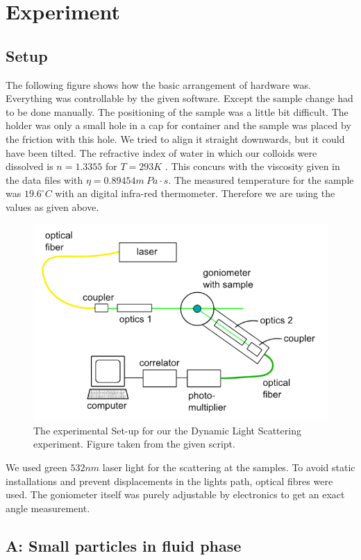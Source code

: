 \documentclass[]{article}
\begin{document}
\newpage
\section{Experiment}
\subsection{Setup}
The following figure shows how the basic arrangement of hardware was. Everything was controllable by the given software. Except the sample change had to be done manually. The positioning of the sample was a little bit difficult. The holder was only a small hole in a cap for container and the sample was placed by the friction with this hole. We tried to align it straight downwards, but it could have been tilted. The refractive index of water in which our colloids were dissolved is $n=1.3355$ for $T=293K$ \cite{refrac}. This concurs with the viscosity given in the data files with $\eta = 0.89454m\: Pa\cdot s$. The measured temperature for the sample was $19.6 ^\circ C$ with an digital infra-red thermometer. Therefore we are using the values as given above.

\begin{figure}[!htbp]
\centering
\includegraphics[width=0.8\linewidth]{Plots/Setup.png}
\caption{The experimental Set-up for our the Dynamic Light Scattering experiment. Figure taken from the given script.}
\end{figure}

We used green $532nm$ laser light for the scattering at the samples. To avoid static installations and prevent displacements in the lights path, optical fibres were used. The goniometer itself was purely adjustable by electronics to get an exact angle measurement.


\subsection{A: Small particles in fluid phase}
\end{document}
